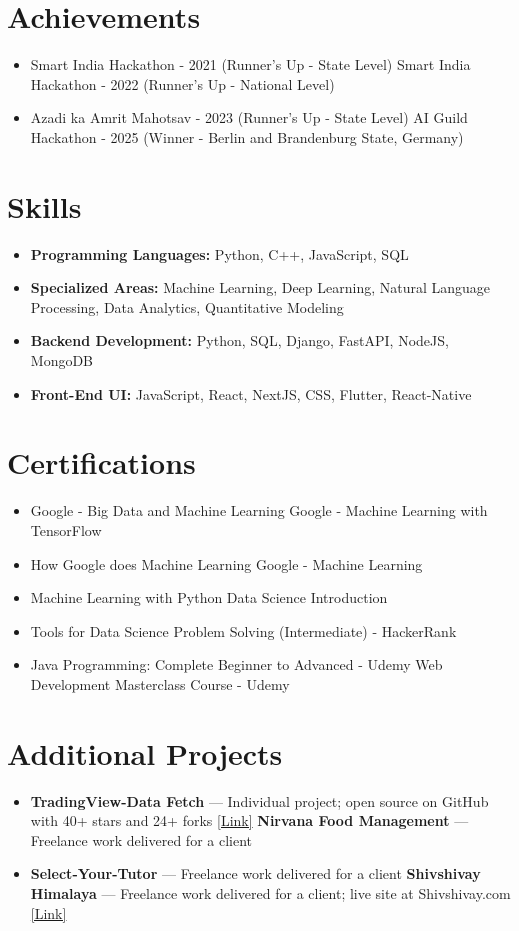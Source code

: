 \documentclass[a4paper,10pt]{article}
\begin{document}
\section*{Achievements}
\begin{itemize}
\item Smart India Hackathon - 2021 (Runner's Up - State Level) \hfill Smart India Hackathon - 2022 (Runner's Up - National Level)
\item Azadi ka Amrit Mahotsav - 2023 (Runner's Up - State Level) \hfill AI Guild Hackathon - 2025 (Winner - Berlin and Brandenburg State, Germany)
\end{itemize}

\section*{Skills}
\begin{itemize}
  \item \textbf{Programming Languages:} Python, C++, JavaScript, SQL
  \item \textbf{Specialized Areas:} Machine Learning, Deep Learning, Natural Language Processing, Data Analytics, Quantitative Modeling
  \item \textbf{Backend Development:} Python, SQL, Django, FastAPI, NodeJS, MongoDB
  \item \textbf{Front-End UI:} JavaScript, React, NextJS, CSS, Flutter, React-Native
\end{itemize}

\section*{Certifications}
\begin{itemize}
\item Google - Big Data and Machine Learning \hfill Google - Machine Learning with TensorFlow
\item How Google does Machine Learning \hfill Google - Machine Learning
\item Machine Learning with Python \hfill Data Science Introduction
\item Tools for Data Science \hfill Problem Solving (Intermediate) - HackerRank
\item Java Programming: Complete Beginner to Advanced - Udemy \hfill Web Development Masterclass Course - Udemy
\end{itemize}

\section*{Additional Projects}
\begin{itemize}
\item \textbf{TradingView-Data Fetch} — Individual project; open source on GitHub with 40+ stars and 24+ forks \href{https://github.com/ravalmeet/TradingView}{[Link]} \hfill \textbf{Nirvana Food Management} — Freelance work delivered for a client
\item \textbf{Select-Your-Tutor} — Freelance work delivered for a client \hfill \textbf{Shivshivay Himalaya} — Freelance work delivered for a client; live site at Shivshivay.com \href{Shivshivay.com}{[Link]}
\end{itemize}
\end{document}
